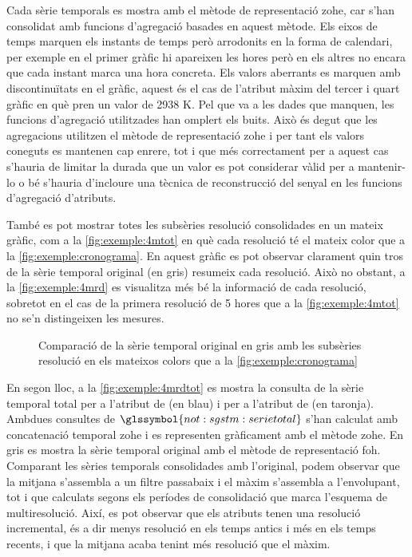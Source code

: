 Cada sèrie temporals es mostra amb el mètode de representació
\gls{zohe}, car s'han consolidat amb funcions d'agregació basades en
aquest mètode.  Els eixos de temps marquen els instants de temps però
arrodonits en la forma de calendari, per exemple en el primer gràfic
hi apareixen les hores però en els altres no encara que cada instant
marca una hora concreta.  Els valors aberrants es marquen amb
discontinuïtats en el gràfic, aquest és el cas de l'atribut màxim del
tercer i quart gràfic en què pren un valor de 2938 K.  Pel que va a
les dades que manquen, les funcions d'agregació utilitzades han
omplert els buits. Això és degut que les agregacions utilitzen el
mètode de representació \gls{zohe} i per tant els valors coneguts es
mantenen cap enrere, tot i que més correctament per a aquest cas
s'hauria de limitar la durada que un valor es pot considerar vàlid per
a mantenir-lo o bé s'hauria d'incloure una tècnica de reconstrucció
del senyal en les funcions d'agregació d'atributs.

També es pot mostrar totes les subsèries resolució consolidades en un
mateix gràfic, com a la \autoref{fig:exemple:4mtot} en què cada
resolució té el mateix color que a la
\autoref{fig:exemple:cronograma}. En aquest gràfic es pot observar
clarament quin tros de la sèrie temporal original (en gris) resumeix
cada resolució. Això no obstant, a la \autoref{fig:exemple:4mrd} es
visualitza més bé la informació de cada resolució, sobretot en el cas
de la primera resolució de 5 hores que a la
\autoref{fig:exemple:4mtot} no se'n distingeixen les mesures.

\begin{figure}[tp]
  \centering
  
  \caption{Comparació de la sèrie temporal original en gris amb les subsèries resolució en els mateixos colors que a la \autoref{fig:exemple:cronograma}}
  \label{fig:exemple:4mtot}
\end{figure}




En segon lloc, a la \autoref{fig:exemple:4mrdtot} es mostra la
consulta de la sèrie temporal total per a l'atribut de
 (en blau) i per a l'atribut de
 (en taronja). Ambdues consultes de
$\glssymbol{not:sgstm:serietotal}$ s'han calculat amb concatenació
temporal \gls{zohe} i es representen gràficament  amb el mètode \gls{zohe}. En gris es mostra la sèrie temporal original
amb el mètode de representació \gls{foh}.  Comparant les sèries
temporals consolidades amb l'original, podem observar que la mitjana
s'assembla a un filtre passabaix i el màxim s'assembla a l'envolupant,
tot i que calculats segons els períodes de consolidació que marca
l'esquema de multiresolució. Així, es pot observar que els atributs
tenen una resolució incremental, és a dir menys resolució en els temps
antics i més en els temps recents, i que la mitjana acaba tenint més
resolució que el màxim.


